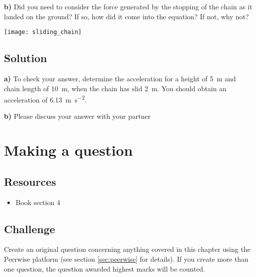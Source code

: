 \textbf{b)} Did you need to consider the force generated by the stopping of the chain as it landed on the ground? If so, how did it come into the equation? If not, why not?

\texttt{[image: sliding\_chain]}

\subsection*{Solution}
\textbf{a)} To check your answer, determine the acceleration for a height of \SI{5}{\meter} and chain length of \SI{10}{\meter}, when the chain has slid \SI{2}{m}. You should obtain an acceleration of \SI{6.13}{\meter\per\square\second}.

\textbf{b)} Please discuss your answer with your partner



\newpage
\section{Making a question}


\subsection*{Resources}
\begin{itemize}
    \item Book section 4
\end{itemize}

\subsection*{Challenge}
Create an original question concerning anything covered in this chapter using the Peerwise platform (see section \ref{sec:peerwise} for details). If you create more than one question, the question awarded highest marks will be counted.

